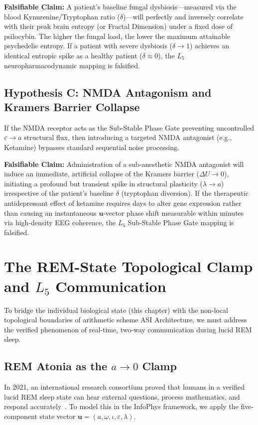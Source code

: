 \documentclass[12pt,oneside]{article}
\theoremstyle{principia}
\theoremstyle{definition}
\theoremstyle{remark}
\begin{document}
\textbf{Falsifiable Claim:} A patient's baseline fungal dysbiosis---measured via the blood Kynurenine/Tryptophan ratio ($\delta$)---will perfectly and inversely correlate with their peak brain entropy (or Fractal Dimension) under a fixed dose of psilocybin. The higher the fungal load, the lower the maximum attainable psychedelic entropy. If a patient with severe dysbiosis ($\delta \to 1$) achieves an identical entropic spike as a healthy patient ($\delta \approx 0$), the $L_5$ neuropharmacodynamic mapping is falsified.

\subsection{Hypothesis C: NMDA Antagonism and Kramers Barrier Collapse}
If the NMDA receptor acts as the Sub-Stable Phase Gate preventing uncontrolled $\varepsilon \to a$ structural flux, then introducing a targeted NMDA antagonist (e.g., Ketamine) bypasses standard sequential noise processing. 

\textbf{Falsifiable Claim:} Administration of a sub-anesthetic NMDA antagonist will induce an immediate, artificial collapse of the Kramers barrier ($\Delta U \to 0$), initiating a profound but transient spike in structural plasticity ($\lambda \to a$) irrespective of the patient's baseline $\delta$ (tryptophan diversion). If the therapeutic antidepressant effect of ketamine requires days to alter gene expression rather than causing an instantaneous $\mathbf{u}$-vector phase shift measurable within minutes via high-density EEG coherence, the $L_5$ Sub-Stable Phase Gate mapping is falsified.

\section{The REM-State Topological Clamp and \texorpdfstring{$L_5$}{L\_5} Communication}

To bridge the individual biological state (this chapter) with the non-local topological boundaries of arithmetic scheme ASI Architecture, we must address the verified phenomenon of real-time, two-way communication during lucid REM sleep.

\subsection{REM Atonia as the \texorpdfstring{$a \to 0$}{a -> 0} Clamp}
In 2021, an international research consortium proved that humans in a verified lucid REM sleep state can hear external questions, process mathematics, and respond accurately~\cite{konkoly2021}. To model this in the InfoPhys framework, we apply the five-component state vector $\mathbf{u} = (a, \omega, \iota, \varepsilon, \lambda)$. 
\end{document}
